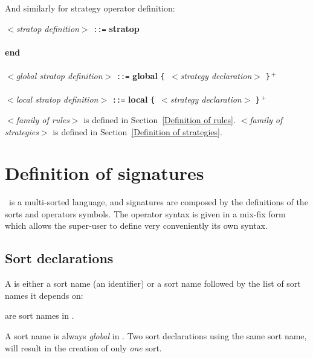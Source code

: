 And similarly for strategy operator definition:


\begin{tabbing}
{\tt $<$}{\em stratop definition}{\tt $>$} \= {\tt ::=} \= {\bf st}\={\bf ratop}\\
\>\>\>  \\
\>\> {\bf end} \\
\\
{\tt $<$}{\em global stratop definition}{\tt $>$} \= {\tt ::=} \= {\bf 
global} {\tt \{ $<$}{\em strategy declaration}{\tt $>$} {\tt \}$^{~+}$ \sym{;}} \\\\
{\tt $<$}{\em local stratop definition}{\tt $>$} \= {\tt ::=} \= {\bf 
local} {\tt \{ $<$}{\em strategy declaration}{\tt $>$} {\tt \}$^{~+}$ \sym{;}} \\
\end{tabbing}
{\tt $<$}{\em family of rules}{\tt $>$}
is defined in Section~\ref{Definition of rules}.
{\tt $<$}{\em family of strategies}{\tt $>$}
is defined in Section~\ref{Definition of strategies}.

\section{Definition of signatures}

\elan\ is a multi-sorted language, and signatures are composed by the
definitions of the sorts and operators symbols. The operator syntax is
given in a mix-fix form which allows the super-user to define very
conveniently its own syntax.

\subsection{Sort declarations}

A  is either
a sort name (an identifier) or a sort name followed by the list of
sort names it depends on:

 {
 \gror
  \sym{[}\sym{]}
}

\EX
{} are sort names in \elan.
\FEX

\REM
A sort name is always {\em global} in \elan. Two sort declarations using the
same sort name, will result in the creation of only {\em one} sort.
\FREM

